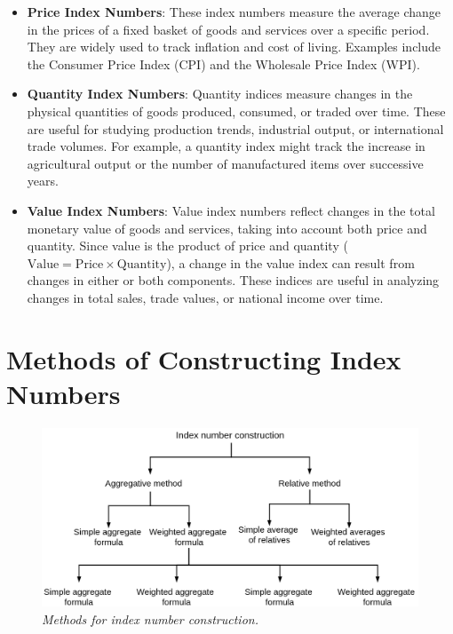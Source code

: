 \documentclass[twoside]{book}
\begin{document}
\begin{itemize}
    \item \textbf{Price Index Numbers}:
    These index numbers measure the average change in the prices of a fixed basket of goods and services over a specific period. They are widely used to track inflation and cost of living. Examples include the Consumer Price Index (CPI) and the Wholesale Price Index (WPI).

    \item \textbf{Quantity Index Numbers}:
    Quantity indices measure changes in the physical quantities of goods produced, consumed, or traded over time. These are useful for studying production trends, industrial output, or international trade volumes. For example, a quantity index might track the increase in agricultural output or the number of manufactured items over successive years.

    \item \textbf{Value Index Numbers}:
    Value index numbers reflect changes in the total monetary value of goods and services, taking into account both price and quantity. Since value is the product of price and quantity ($\text{Value} = \text{Price} \times \text{Quantity}$), a change in the value index can result from changes in either or both components. These indices are useful in analyzing changes in total sales, trade values, or national income over time.
\end{itemize}



\section{Methods of Constructing Index Numbers}

\begin{figure}[H]
\begin{center}
\includegraphics[scale=0.3]{pic/index number.png}
\end{center}
\caption{\textit{Methods for index number construction.}}
\end{figure}
\end{document}
